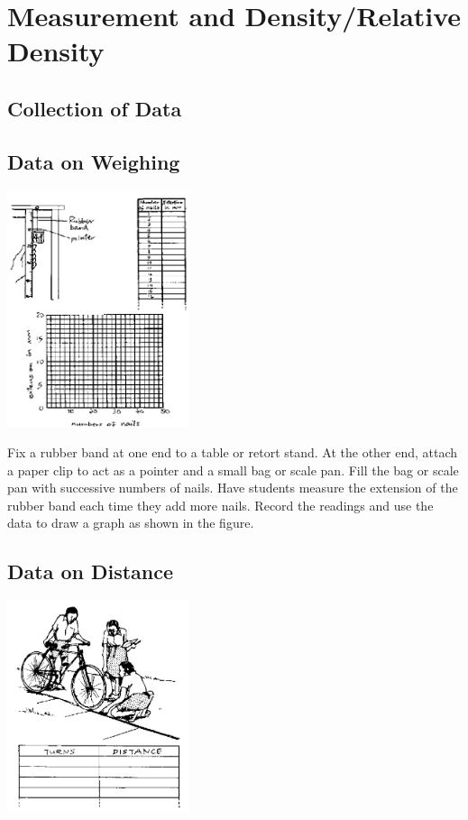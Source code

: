 \section{Measurement and Density/Relative Density}

\begin{multicols}{2}

\section*{Collection of Data}


\subsection{Data on Weighing}

\begin{center}
\includegraphics[width=0.4\textwidth]{./img/source/meas-mass.png}
\end{center}

Fix a rubber band at one end to a table or retort stand. At the other end, attach a paper clip to act as a pointer and a small bag or scale pan. Fill the bag or scale pan with successive numbers of nails. Have students measure the extension of the rubber band each time they add more nails. Record the readings and use the data to draw a graph as shown in the figure.

\subsection{Data on Distance}

\begin{center}
\includegraphics[width=0.4\textwidth]{./img/source/meas-distance.png}
\end{center}


\end{multicols}
